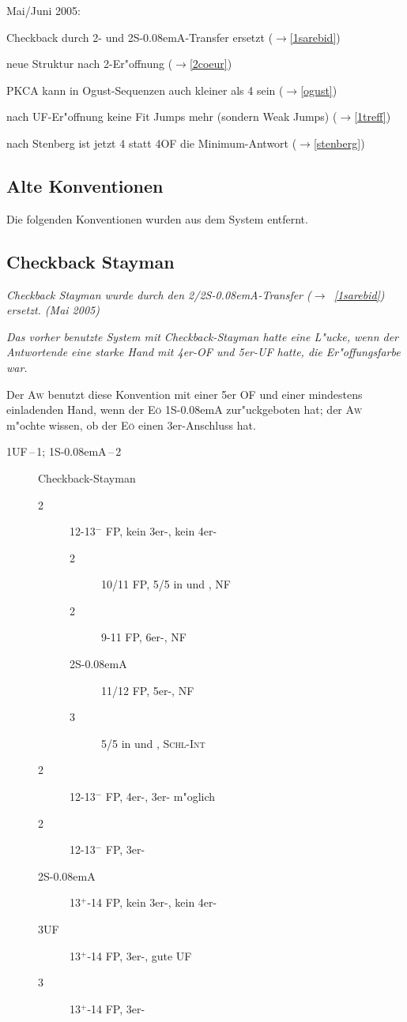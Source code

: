 \documentclass[11pt,german,twocolumn,twoside]{scrartcl}
\def\pi{\Sp\xspace}
\def\co{\He\xspace}
\def\sa{\nobreak\textsf{S\kern-0.08emA}\xspace}
\def\ofa{\nobreak\textsf{OF}\xspace}
\def\ufa{\nobreak\textsf{UF}\xspace}
\def\pik{\nobreak\hspace{\cardskip}\Sp\xspace}
\def\coe{\nobreak\hspace{\cardskip}\He\xspace}
\def\kar{\nobreak\hspace{\cardskip}\Di\xspace}
\def\tre{\nobreak\hspace{\cardskip}\Cl\xspace}
\def\SA{\nobreak\hspace{\cardskip}\sa}
\def\of{\nobreak\hspace{\cardskip}\textsf{OF}\xspace}
\def\good{$^+$\xspace}
\def\bad{$^-$\xspace}
\def\ra{$\rightarrow$\xspace}
\def\sep{\,--\,}
\def\nf{\textsc{NF}\xspace}
\def\aw{\textsc{Aw}\xspace}
\def\eo{\textsc{E\"o}\xspace}
\def\slamint{\textsc{Schl-Int}\xspace}
\def\bdsc{\begin{description}}
\def\edsc{\end{description}}
\begin{document}
\begin{appendix}
Mai/Juni 2005:
\begin{compactitem}
\item Checkback durch 2\tre- und 2\SA-Transfer ersetzt (\ra \ref{1sarebid})
\item neue Struktur nach 2\coe-Er"offnung (\ra \ref{2coeur})
\item PKCA kann in Ogust-Sequenzen auch kleiner als 4\tre sein (\ra \ref{ogust})
\item nach \ufa-Er"offnung keine Fit Jumps mehr (sondern Weak Jumps) (\ra \ref{1treff})
\item nach Stenberg ist jetzt 4\tre statt 4\of die Minimum-Antwort (\ra \ref{stenberg})
\end{compactitem}

\subsection{Alte Konventionen}

Die folgenden Konventionen wurden aus dem System entfernt.

\subsection*{Checkback Stayman}

\emph{Checkback Stayman wurde durch den 2\tre/2\SA-Transfer (\ra~\ref{1sarebid})
ersetzt. (Mai 2005)}

\emph{Das vorher benutzte System mit Checkback-Stayman hatte eine L"ucke, wenn der Antwortende
eine starke Hand mit 4er-\ofa und 5er-\ufa hatte, die Er"offungsfarbe war.}

Der \aw benutzt diese Konvention mit einer 5er \ofa und einer mindestens
einladenden Hand, wenn der \eo 1\SA zur"uckgeboten hat; der \aw m"ochte
wissen, ob der \eo einen 3er-Anschluss hat.

\bdsc
\item[1\ufa{}\sep1\pik; 1\SA{}\sep2\tre] Checkback-Stayman
 \bdsc
 \item[2\kar] 12-13\bad{} FP, kein 3er-\pi, kein 4er-\co
  \bdsc
  \item[2\coe] 10/11 FP, 5/5 in \co und \pi, \nf
  \item[2\pik] 9-11 FP, 6er-\pi, \nf
  \item[2\SA] 11/12 FP, 5er-\pi, \nf
  \item[3\coe] 5/5 in \co und \pi, \slamint
  \edsc
 \item[2\coe] 12-13\bad{} FP, 4er-\co, 3er-\pi m"oglich
 \item[2\pik] 12-13\bad{} FP, 3er-\pi
 \item[2\SA]  13\good{}-14 FP, kein 3er-\pi, kein 4er-\co
 \item[3\ufa] 13\good{}-14 FP, 3er-\pi, gute \ufa
 \item[3\pik] 13\good{}-14 FP, 3er-\pi
 \edsc
\edsc


\end{appendix}
\end{document}
